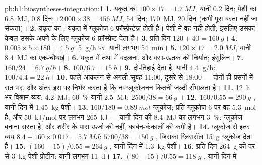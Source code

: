 \begin{solution}{pb:b1:biosyntheses-integration:1}
\textbf{1.} यकृत का  $100\times 17 = \qty{1.7}{MJ}$, यानी 0.2 दिन;
पेशी का  \qty{6.8}{MJ}, 0.8 दिन;  $12\,000\times 38 =
\qty{456}{MJ}$, 54 दिन;  \qty{170}{MJ}, 20 दिन (कभी पूरा
बरता नहीं जा सकता)।
\textbf{2.} यकृत का : यकृत में ग्लूकोज-6-फ़ॉस्फ़ेटेज़ होती है।
पेशी में वह नहीं होती, इसलिए उसका  केवल उसके अपने
 के लिए ग्लूकोज-6-फ़ॉस्फ़ेट देता है।
\textbf{3.} प्रति दिन $120 + 40 = \qty{160}{g}$।
\textbf{4.} $0.005\times 5\times 180 = \qty{4.5}{g}$: \qty{5}{g/h} पर, यानी लगभग \qty{54}{min}।
\textbf{5.} $120\times 17 = \qty{2.0}{MJ}$, यानी \qty{8.4}{MJ} का एक-चौथाई।
\textbf{6.} यकृत में  तथा  में बदलना, और वसा-ऊतक
को निर्यात; इंसुलिन।
\textbf{7.} $160/24 = \qty{6.7}{g/h}$।
\textbf{8.} $100/6.7 = \qty{15}{h}$।
\textbf{9.}  दो-तिहाई देता है, यानी \qty{4.4}{g/h}: $100/4.4 =
\qty{22}{h}$।
\textbf{10.} पहले आकलन से अगली सुबह 11:00, दूसरे से 18:00 --- दोनों ही
प्रसंगों में रात भर, और अंतर इस पर निर्भर करता है कि नवग्लूकोजनन कितनी
जल्दी सँभालता है।
\textbf{11.} \qty{12}{h} भर विश्राम-व्यय: \qty{4.2}{MJ};
\qty{60}{\%} यानी \qty{2.5}{MJ}; $2500/38 = \qty{66}{g}$ ।
\textbf{12.} $160/0.55 = \qty{290}{g}$ , यानी दिन में \qty{1.45}{kg}
पेशी।
\textbf{13.} $160/180 = \qty{0.89}{mol}$ ग्लूकोज; प्रति ग्लूकोज 6 
पर वह \qty{5.3}{mol}  है, और \qty{50}{kJ/mol} पर
लगभग \qty{265}{kJ} --- यानी दिन की \qty{8.4}{MJ} का लगभग \qty{3}{\%}:
ग्लूकोज बनाना सस्ता है, और शरीर के पास ऊर्जा की नहीं,
कार्बन-कंकालों की कमी है।
\textbf{14.} ग्लूकोज से इतर व्यय $8.4 - 160\times 0.017 =
\qty{5.7}{MJ}$: $5700/38 = \qty{150}{g}$ , जिसका ग्लिसरॉल
\qty{15}{g} ग्लूकोज देता है।
\textbf{15.} $(160 - 15)/0.55 = \qty{264}{g}$ , यानी दिन में
\qty{1.3}{kg} पेशी।
\textbf{16.} प्रति दिन \qty{264}{g} की दर से \qty{3}{kg} पेशी-प्रोटीन:
यानी लगभग \qty{11}{d}।
\textbf{17.} $(80 - 15)/0.55 = \qty{118}{g}$ , यानी दिन में

\end{solution}
